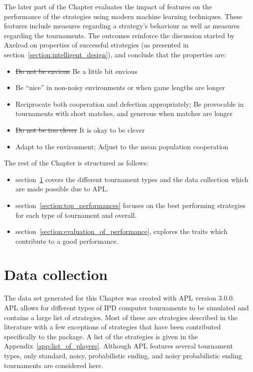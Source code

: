 The later part of the Chapter evaluates the impact of features on the
performance of the strategies using modern machine learning techniques. These
features include measures regarding a strategy's behaviour as well as measures
regarding the tournaments. The outcomes reinforce the discussion started by
Axelrod on properties of successful strategies (as presented in
section~\ref{section:intelligent_design}), and conclude that the properties are:

\begin{itemize}
    \item \st{Do not be envious} Be a little bit envious
    \item Be ``nice'' in non-noisy environments or when game lengths are longer
    \item Reciprocate both cooperation and defection appropriately;
    Be provocable in tournaments with short matches, and generous when matches are longer
    \item \st{Do not be too clever} It is okay to be clever
    \item Adapt to the environment; Adjust to the mean population cooperation
\end{itemize}

The rest of the Chapter is structured as follows:

\begin{itemize}
    \item section~\ref{section:data_collection} covers the different tournament
    types and the data collection which are made possible due to APL.
    \item section~\ref{section:top_performances} focuses on the best performing
    strategies for each type of tournament and overall.
    \item section~\ref{section:evaluation_of_performance}, explores the traits
    which contribute to a good performance.
\end{itemize}

\section{Data collection}\label{section:data_collection}

The data set generated for this Chapter was created with APL version 3.0.0.
APL allows for different types of IPD computer
tournaments to be simulated and contains a large list of strategies.
Most of these are strategies described in the literature with a few exceptions
of strategies that have been contributed specifically to the package. A
list of the strategies is given in the Appendix~\ref{app:list_of_players}.
Although APL features several tournament types, only
standard, noisy, probabilistic ending, and noisy probabilistic ending
tournaments are considered here.

